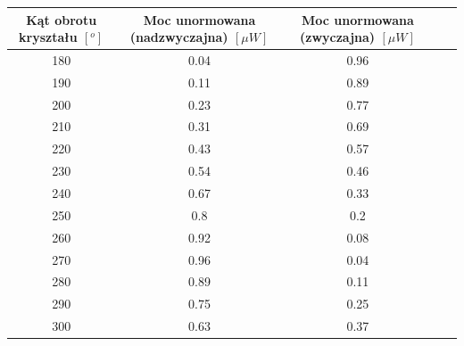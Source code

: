 \documentclass[quantumrep,article,accept,oneauthor,pdftex]{Definitions/mdpi}
\begin{document}
\begin{table}[H]
\centering
\begin{tabular}{ccccc}
\toprule
\textbf{Kąt obrotu kryształu \( [^o] \)} & \textbf{Moc unormowana (nadzwyczajna) \( [\mu W] \)} & \textbf{Moc unormowana (zwyczajna) \( [\mu W] \)} \\
\midrule
180                                   & 0.04                                            & 0.96                                         \\
190                                   & 0.11                                            & 0.89                                         \\
200                                   & 0.23                                            & 0.77                                         \\
210                                   & 0.31                                            & 0.69                                         \\
220                                   & 0.43                                            & 0.57                                         \\
230                                   & 0.54                                            & 0.46                                         \\
240                                   & 0.67                                            & 0.33                                         \\
250                                   & 0.8                                             & 0.2                                          \\
260                                   & 0.92                                            & 0.08                                         \\
270                                   & 0.96                                            & 0.04                                         \\
280                                   & 0.89                                            & 0.11                                         \\
290                                   & 0.75                                            & 0.25                                         \\
300                                   & 0.63                                            & 0.37                                         \\

\end{tabular}
\end{table}
\end{document}
